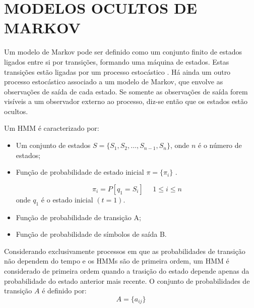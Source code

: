 \chapter{MODELOS OCULTOS DE MARKOV}
\thispagestyle{plain}
\quad Um modelo de Markov pode ser definido como um conjunto finito de estados ligados entre si por transições, formando uma máquina de estados. Estas transições estão ligadas por um processo estocástico .  Há ainda um outro processo estocástico associado a um modelo de Markov, que envolve as observações de saída de cada estado. Se somente as observações de saída forem visíveis a um observador externo ao processo, diz-se então que os estados estão ocultos. %




Um HMM é caracterizado por:

\begin{itemize}

\item  Um conjunto de estados $ S =  \{S_1, S_2, \ldots, S_{n-1}, S_n\} $, onde $n$ é o número de estados;

\item Função de probabilidade de estado inicial $\pi = \{\pi_i\}$ .

\begin{equation}
\pi_i = P[q_1 = S_i ]~~\textrm{ }~ 1 \leq i \leq n 
\end{equation}
onde $q_1$ é o estado inicial $(t = 1)$.

\item Função de probabilidade de transição A;

\item Função de probabilidade de símbolos de saída B.

\end{itemize}

Considerando exclusivamente processos em que as probabilidades de transição não dependem do tempo e os HMMs são de primeira ordem, um HMM é considerado de primeira ordem quando a trasição do estado depende apenas da probabilidade do estado anterior mais recente. O conjunto de probabilidades de transição $A$ é definido por: 
 \begin{equation}
A = \{ a_{ij}\} 
\end{equation}

